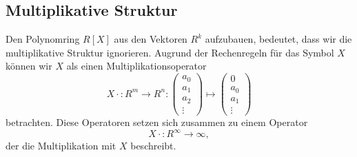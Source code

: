 \subsection{Multiplikative Struktur
\label{buch:subsection:polynome:multiplikativestruktur}}
Den Polynomring $R[X]$ aus den Vektoren $R^{k}$ aufzubauen, bedeutet,
dass wir die multiplikative Struktur ignorieren.
Augrund der Rechenregeln für das Symbol $X$ können wir $X$ als einen
Multiplikationsoperator 
\[
{X\cdot} 
\colon R^{m} \to R^{n}
:
\begin{pmatrix}a_0\\a_1\\a_2\\\vdots\end{pmatrix}
\mapsto
\begin{pmatrix}0\\a_0\\a_1\\\vdots\end{pmatrix}
\]
betrachten.
Diese Operatoren setzen sich zusammen zu einem Operator
\[
{X\cdot} : R^\infty \to \infty,
\]
der die Multiplikation mit $X$ beschreibt.

